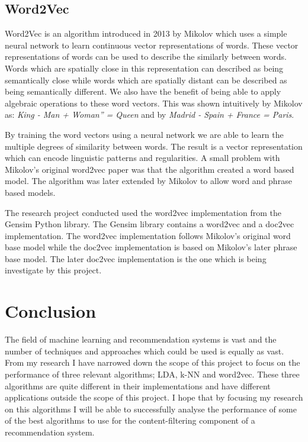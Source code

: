 \subsection{Word2Vec}
Word2Vec is an algorithm introduced in 2013 by Mikolov which uses a simple neural network to learn continuous vector representations of words.
These vector representations of words can be used to describe the similarly between words.
Words which are spatially close in this representation can described as being semantically close while words which are spatially distant can be described as being semantically different.
We also have the benefit of being able to apply algebraic operations to these  word vectors.
This was shown intuitively by Mikolov as: \textit{King - Man + Woman” = Queen} and by \textit{Madrid - Spain + France = Paris}.

By training the word vectors using a neural network we are able to learn the multiple degrees of similarity between words\cite{Mikolov1}.
The result is a vector representation which can encode linguistic patterns and regularities.\cite{Mikolov2}
A small problem with Mikolov's original word2vec paper was that the algorithm created a word based model.
The algorithm was later extended by Mikolov to allow word and phrase based models.\cite{Mikolov2}

The research project conducted used the word2vec implementation from the Gensim Python library.
The Gensim library contains a word2vec and a doc2vec implementation. The word2vec implementation follows Mikolov's original word base model while the doc2vec implementation is based on Mikolov's later phrase base model.\cite{radimDoc2Vec}
The later doc2vec implementation is the one which is being investigate by this project.


\section{Conclusion}
The field of machine learning and recommendation systems is vast and the number of techniques and approaches which could be used is equally as vast.
From my research I have narrowed down the scope of this project to focus on the performance of three relevant algorithms; LDA, k-NN and word2vec.
These three algorithms are quite different in their implementations and have different applications outside the scope of this project.
I hope that by focusing my research on this algorithms I will be able to successfully analyse the performance of some of the best algorithms to use for the content-filtering component of a recommendation system.
